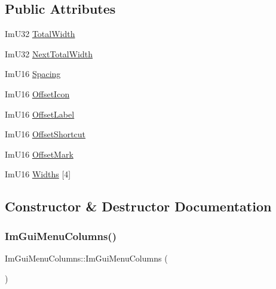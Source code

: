 \subsection*{Public Attributes}
\begin{DoxyCompactItemize}
\item 
Im\+U32 \hyperlink{structImGuiMenuColumns_a4384d90f9c7974425ad9165eed996297}{Total\+Width}
\item 
Im\+U32 \hyperlink{structImGuiMenuColumns_ab6c94ddd6147a8ef1fc37a20ca0990dd}{Next\+Total\+Width}
\item 
Im\+U16 \hyperlink{structImGuiMenuColumns_ad3ff6a7b69d0e73dbe80b949d871fbec}{Spacing}
\item 
Im\+U16 \hyperlink{structImGuiMenuColumns_a9f591cacefd793c3f3bbfcee7ccedaf7}{Offset\+Icon}
\item 
Im\+U16 \hyperlink{structImGuiMenuColumns_aad3c73c88286f0f65abdc9ec56e7f84f}{Offset\+Label}
\item 
Im\+U16 \hyperlink{structImGuiMenuColumns_ab33e02f4291fec8296ebc2bebc86f1a5}{Offset\+Shortcut}
\item 
Im\+U16 \hyperlink{structImGuiMenuColumns_adc12e8f6950487652995fc705459f7fc}{Offset\+Mark}
\item 
Im\+U16 \hyperlink{structImGuiMenuColumns_a1b977a8fbffb965ba5db5066ff6a7eef}{Widths} \mbox{[}4\mbox{]}
\end{DoxyCompactItemize}


\subsection{Constructor \& Destructor Documentation}
\mbox{\label{structImGuiMenuColumns_ac476e04a9d907280b3ccdfc429845803}} 
\subsubsection{\texorpdfstring{Im\+Gui\+Menu\+Columns()}{ImGuiMenuColumns()}}
{\footnotesize\ttfamily Im\+Gui\+Menu\+Columns\+::\+Im\+Gui\+Menu\+Columns (\begin{DoxyParamCaption}{ }\end{DoxyParamCaption})\hspace{0.3cm}{\ttfamily [inline]}}



